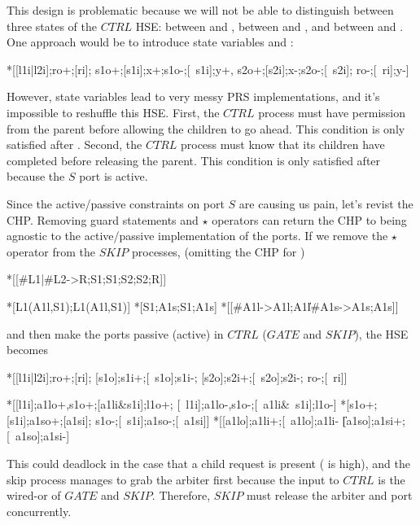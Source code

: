 \documentclass[aer.tex]{subfiles}
\begin{document}
\noindent This design is problematic because 
we will not be able to distinguish between three states of the $CTRL$ HSE: 
between \code{[ri]} and ,
between \code{[$\neg$s1i]} and , and 
between \code{[$\neg$s2i]} and . 
One approach would be to introduce state variables  and :

\begin{hse}
  *[[l1i|l2i];ro+;[ri];
    s1o+;[s1i];x+;s1o-;[~s1i];y+,
    s2o+;[s2i];x-;s2o-;[~s2i];
    ro-;[~ri];y-]
\end{hse}

\noindent However, state variables lead to very messy PRS implementations, and
it's impossible to reshuffle this HSE. 
First, the $CTRL$ process must have permission from the parent before allowing the children to go ahead.
This condition is only satisfied after \code{[ri]}.
Second, the $CTRL$ process must know that its children have completed before releasing the parent.
This condition is only satisfied after \code{[$\neg$s2i]} because the $S$ port is active.

Since the active/passive constraints on port $S$ are causing us pain, let's revist the CHP.
Removing guard statements and $\star$ operators can return the CHP to being agnostic to the 
active/passive implementation of the ports. 
If we remove the $\star$ operator from the $SKIP$ processes, (omitting the CHP for )

\begin{csp}
  *[[#{L1}|#{L2}->R;S1;S1;S2;S2;R]]

  *[L1\star(A1l,S1);L1\star(A1l,S1)]
  *[S1;A1s;S1;A1s]
  *[[#{A1l}->A1l;A1l\|#{A1s}->A1s;A1s]]
\end{csp}

\noindent and then make the  ports passive (active) in $CTRL$ ($GATE$ and $SKIP$), the HSE becomes

\begin{hse}
  *[[l1i|l2i];ro+;[ri];
    [s1o];s1i+;[~s1o];s1i-;
    [s2o];s2i+;[~s2o];s2i-;
    ro-;[~ri]]
    
  *[[l1i];a1lo+,s1o+;[a1li&s1i];l1o+;
    [~l1i];a1lo-,s1o-;[~a1li&~s1i];l1o-]
  *[s1o+;[s1i];a1so+;[a1si];
    s1o-;[~s1i];a1so-;[~a1si]]
  *[[a1lo];a1li+;[~a1lo];a1li-
   \|[a1so];a1si+;[~a1so];a1si-]
\end{hse}

\noindent This could deadlock in the case that a child request is present ( is high),
and the skip process manages to grab the arbiter first because the  input to $CTRL$ 
is the wired-or of $GATE$ and $SKIP$. Therefore, $SKIP$ must release the arbiter and 
port concurrently.
\end{document}
